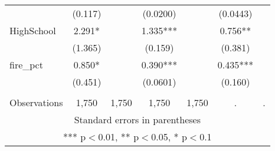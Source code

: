 \begin{tabular}{lcccccc}
 & (0.117) &  & (0.0200) &  & (0.0443) &  \\
HighSchool & 2.291* &  & 1.335*** &  & 0.756** &  \\
 & (1.365) &  & (0.159) &  & (0.381) &  \\
fire\_pct & 0.850* &  & 0.390*** &  & 0.435*** &  \\
 & (0.451) &  & (0.0601) &  & (0.160) &  \\
 &  &  &  &  &  &  \\
 Observations & 1,750 & 1,750 & 1,750 & 1,750 & . & . \\ \hline
\multicolumn{7}{c}{ Standard errors in parentheses} \\
\multicolumn{7}{c}{ *** p$<$0.01, ** p$<$0.05, * p$<$0.1} \\
\end{tabular}
